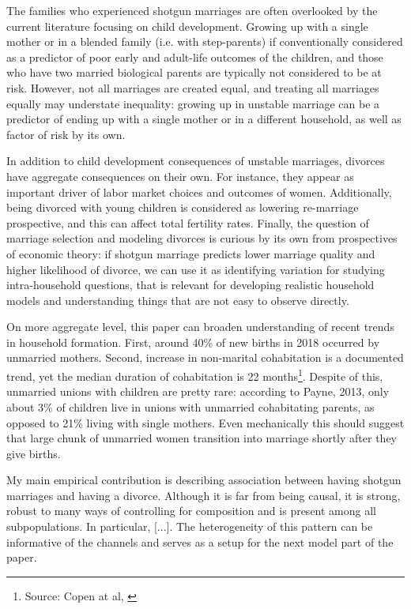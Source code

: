 \documentclass[12pt,letter]{article}
\begin{document}
The families who experienced shotgun marriages are often overlooked by the current literature focusing on child development. Growing up with a single mother or in a blended family (i.e. with step-parents) if conventionally considered as a predictor of poor early and adult-life outcomes of the children, and those who have two married biological parents are typically not considered to be at risk. However, not all marriages are created equal, and treating all marriages equally may understate inequality: growing up in unstable marriage can be a predictor of ending up with a single mother or in a different household, as well as factor of risk by its own.

In addition to child development consequences of unstable marriages, divorces have aggregate consequences on their own. For instance, they appear as important driver of labor market choices and outcomes of women. Additionally, being divorced with young children is considered as lowering re-marriage prospective, and this can affect total fertility rates. Finally, the question of marriage selection and modeling divorces is curious by its own from prospectives of economic theory: if shotgun marriage predicts lower marriage quality and higher likelihood of divorce, we can use it as identifying variation for studying intra-household questions, that is relevant for developing realistic household models and understanding things that are not easy to observe directly.

On more aggregate level, this paper can broaden understanding of recent trends in household formation. First, around 40\% of new births in 2018 occurred by unmarried mothers. Second, increase in non-marital cohabitation is a documented trend, yet the median duration of cohabitation is 22 months\footnote{Source: Copen at al,  \cite{copen}}. Despite of this, unmarried unions with children are pretty rare: according to Payne, 2013\nocite{payne}, only about 3\% of children live in unions with unmarried cohabitating parents, as opposed to 21\% living with single mothers. Even mechanically this should suggest that large chunk of unmarried women transition into marriage shortly after they give births.

My main empirical contribution is describing association between having shotgun marriages and having a divorce. Although it is far from being causal, it is strong, robust to many ways of controlling for composition and is present among all subpopulations. In particular, [...]. The heterogeneity of this pattern can be informative of the channels and serves as a setup for the next model part of the paper.
\end{document}
